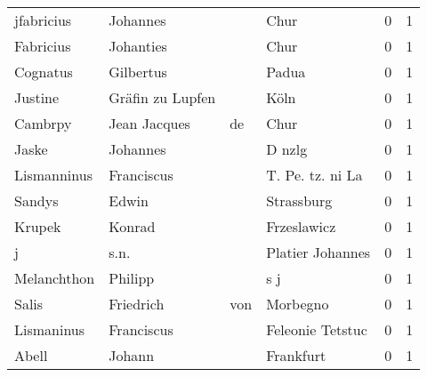 \begin{tabular}{llllrr}
               jfabricius &                           Johannes &             &                                        Chur &          0 &         1 \\
                Fabricius &                          Johanties &             &                                        Chur &          0 &         1 \\
                 Cognatus &                          Gilbertus &             &                                       Padua &          0 &         1 \\
                  Justine &                   Gräfin zu Lupfen &             &                                        Köln &          0 &         1 \\
                  Cambrpy &                       Jean Jacques &          de &                                        Chur &          0 &         1 \\
                    Jaske &                           Johannes &             &                                      D nzlg &          0 &         1 \\
              Lismanninus &                         Franciscus &             &                            T. Pe. tz. ni La &          0 &         1 \\
                   Sandys &                              Edwin &             &                                  Strassburg &          0 &         1 \\
                   Krupek &                             Konrad &             &                                 Frzeslawicz &          0 &         1 \\
                        j &                               s.n. &             &                            Platier Johannes &          0 &         1 \\
              Melanchthon &                            Philipp &             &                                         s j &          0 &         1 \\
                    Salis &                          Friedrich &         von &                                    Morbegno &          0 &         1 \\
               Lismaninus &                         Franciscus &             &                            Feleonie Tetstuc &          0 &         1 \\
                    Abell &                             Johann &             &                                   Frankfurt &          0 &         1 \\

\end{tabular}
